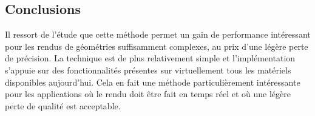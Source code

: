 \subsection{Conclusions}
Il ressort de l'étude que cette méthode permet un gain de performance intéressant pour les rendus de géométries suffisamment
complexes, au prix d'une légère perte de précision. La technique est de plus relativement simple et l'implémentation
s'appuie sur des fonctionnalités présentes sur virtuellement tous les matériels disponibles aujourd'hui. Cela en fait une
méthode particulièrement intéressante pour les applications où le rendu doit être fait en temps réel et où une légère perte
de qualité est acceptable.
